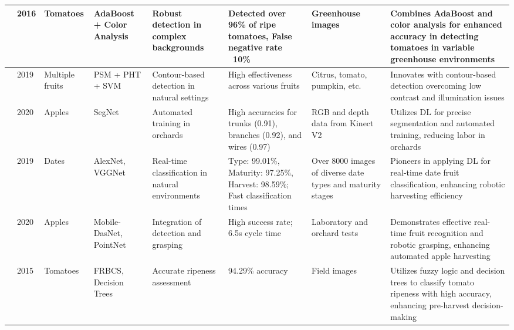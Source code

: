 \documentclass[a4paper,fleqn]{cas-dc}
\begin{document}
\begin{table}[htbp]
\begin{tabular}{@{}p{0.4cm}p{0.4cm}p{1.4cm}p{1.4cm}p{2cm}p{2cm}p{2cm}p{4.5cm}@{}}
\cite{zhao2016detecting} & 2016 & Tomatoes & AdaBoost + Color Analysis & Robust detection in complex backgrounds & Detected over 96\% of ripe tomatoes, False negative rate ~10\% & Greenhouse images & Combines AdaBoost and color analysis for enhanced accuracy in detecting tomatoes in variable greenhouse environments \\ \midrule
\cite{lin2020fruit} & 2019 & Multiple fruits & PSM + PHT + SVM & Contour-based detection in natural settings & High effectiveness across various fruits & Citrus, tomato, pumpkin, etc. & Innovates with contour-based detection overcoming low contrast and illumination issues \\  \midrule
\cite{majeed2020deep} & 2020 & Apples & SegNet & Automated training in orchards & High accuracies for trunks (0.91), branches (0.92), and wires (0.97) & RGB and depth data from Kinect V2 & Utilizes DL for precise segmentation and automated training, reducing labor in orchards \\ \midrule
\cite{altaheri2019date}  & 2019 & Dates & AlexNet, VGGNet & Real-time classification in natural environments & Type: 99.01\%, Maturity: 97.25\%, Harvest: 98.59\%; Fast classification times & Over 8000 images of diverse date types and maturity stages & Pioneers in applying DL for real-time date fruit classification, enhancing robotic harvesting efficiency \\  \midrule
\cite{kang2020real}  & 2020 & Apples & Mobile-DasNet, PointNet & Integration of detection and grasping & High success rate; 6.5s cycle time & Laboratory and orchard tests & Demonstrates effective real-time fruit recognition and robotic grasping, enhancing automated apple harvesting \\ \midrule
\cite{goel2015fuzzy} & 2015 & Tomatoes & FRBCS, Decision Trees & Accurate ripeness assessment & 94.29\% accuracy & Field images & Utilizes fuzzy logic and decision trees to classify tomato ripeness with high accuracy, enhancing pre-harvest decision-making \\  \midrule
\end{tabular}
\end{table}
\end{document}
